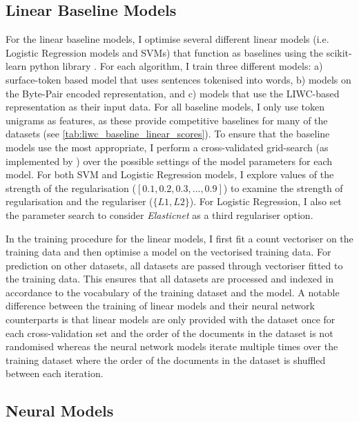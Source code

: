 \subsection{Linear Baseline Models}\label{sec:baseline_models}

For the linear baseline models, I optimise several different linear models (i.e. Logistic Regression models and SVMs) that function as baselines using the scikit-learn python library \citet{Pedregosa:2011}.
For each algorithm, I train three different models: a) surface-token based model that uses sentences tokenised into words, b) models on the Byte-Pair encoded representation, and c) models that use the LIWC-based representation as their input data.
For all baseline models, I only use token unigrams as features, as these provide competitive baselines for many of the datasets (see \autoref{tab:liwc_baseline_linear_scores}).
To ensure that the baseline models use the most appropriate, I perform a cross-validated grid-search (as implemented by \citet{Pedregosa:2015}) over the possible settings of the model parameters for each model.
For both SVM and Logistic Regression models, I explore values of the strength of the regularisation ($[0.1, 0.2, 0.3, \ldots, 0.9]$) to examine the strength of regularisation and the regulariser ($\{L1, L2\}$). For Logistic Regression, I also set the parameter search to consider \textit{Elasticnet} as a third regulariser option.

In the training procedure for the linear models, I first fit a count vectoriser on the training data and then optimise a model on the vectorised training data. 
For prediction on other datasets, all datasets are passed through vectoriser fitted to the training data. 
This ensures that all datasets are processed and indexed in accordance to the vocabulary of the training dataset and the model. 
A notable difference between the training of linear models and their neural network counterparts is that linear models are only provided with the dataset once for each cross-validation set and the order of the documents in the dataset is not randomised whereas the neural network models iterate multiple times over the training dataset where the order of the documents in the dataset is shuffled between each iteration.

\subsection{Neural Models}\label{sec:redux_neural}

